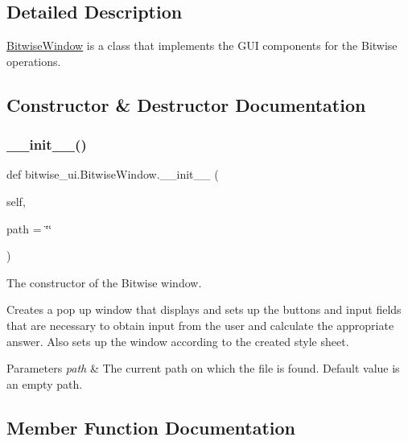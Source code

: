 \subsection{Detailed Description}
\hyperlink{classbitwise__ui_1_1_bitwise_window}{Bitwise\+Window} is a class that implements the G\+UI components for the Bitwise operations. 

\subsection{Constructor \& Destructor Documentation}
\mbox{\label{classbitwise__ui_1_1_bitwise_window_a5f91a64a61e0cd5282e40925c4417171}} 
\subsubsection{\texorpdfstring{\+\_\+\+\_\+init\+\_\+\+\_\+()}{\_\_init\_\_()}}
{\footnotesize\ttfamily def bitwise\+\_\+ui.\+Bitwise\+Window.\+\_\+\+\_\+init\+\_\+\+\_\+ (\begin{DoxyParamCaption}\item[{}]{self,  }\item[{}]{path = {\ttfamily \char`\"{}\char`\"{}} }\end{DoxyParamCaption})}



The constructor of the Bitwise window. 

Creates a pop up window that displays and sets up the buttons and input fields that are necessary to obtain input from the user and calculate the appropriate answer. Also sets up the window according to the created style sheet. 
\begin{DoxyParams}{Parameters}
{\em path} & The current path on which the file is found. Default value is an empty path. \\
\hline
\end{DoxyParams}


\subsection{Member Function Documentation}
\mbox{\label{classbitwise__ui_1_1_bitwise_window_a3eafe17fad0d129cd2bbab0d84e0e450}} 
